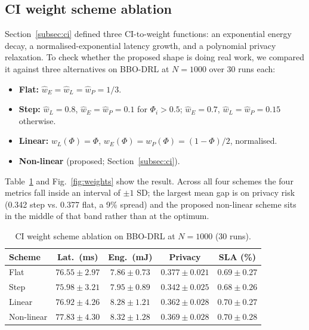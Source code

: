 \documentclass[journal]{IEEEtran}
\begin{document}
\subsection{CI weight scheme ablation}
\label{subsec:weights}

Section~\ref{subsec:ci} defined three CI-to-weight functions: an
exponential energy decay, a normalised-exponential latency growth, and
a polynomial privacy relaxation. To check whether the proposed shape
is doing real work, we compared it against three alternatives on
BBO-DRL at $N = 1000$ over 30 runs each:

\begin{itemize}
  \item \textbf{Flat:} $\hat w_E = \hat w_L = \hat w_P = 1/3$.
  \item \textbf{Step:} $\hat w_L = 0.8$, $\hat w_E = \hat w_P = 0.1$
        for $\Phi_i > 0.5$; $\hat w_E = 0.7$, $\hat w_L = \hat w_P = 0.15$
        otherwise.
  \item \textbf{Linear:} $w_L(\Phi)=\Phi$, $w_E(\Phi)=w_P(\Phi)=
        (1-\Phi)/2$, normalised.
  \item \textbf{Non-linear} (proposed; Section~\ref{subsec:ci}).
\end{itemize}

Table~\ref{tab:weights} and Fig.~\ref{fig:weights} show the result.
Across all four schemes the four metrics fall inside an interval of
$\pm 1$ SD; the largest mean gap is on privacy risk (0.342 step vs.
0.377 flat, a 9\% spread) and the proposed non-linear scheme sits in
the middle of that band rather than at the optimum.

\begin{table}[t]
  \centering
  \caption{CI weight scheme ablation on BBO-DRL at $N = 1000$
           (30 runs).}
  \label{tab:weights}
  \renewcommand{\arraystretch}{1.15}
  \begin{tabular}{lcccc}
    \toprule
    \textbf{Scheme} &
    \textbf{Lat.\ (ms)} & \textbf{Eng.\ (mJ)} &
    \textbf{Privacy} & \textbf{SLA (\%)} \\
    \midrule
    Flat       & $76.55 \pm 2.97$ & $7.86 \pm 0.73$ & $0.377 \pm 0.021$ & $0.69 \pm 0.27$ \\
    Step       & $75.98 \pm 3.21$ & $7.95 \pm 0.89$ & $0.342 \pm 0.025$ & $0.68 \pm 0.26$ \\
    Linear     & $76.92 \pm 4.26$ & $8.28 \pm 1.21$ & $0.362 \pm 0.028$ & $0.70 \pm 0.27$ \\
    Non-linear & $77.83 \pm 4.30$ & $8.32 \pm 1.28$ & $0.369 \pm 0.028$ & $0.70 \pm 0.28$ \\
    \bottomrule
  \end{tabular}
\end{table}
\end{document}
